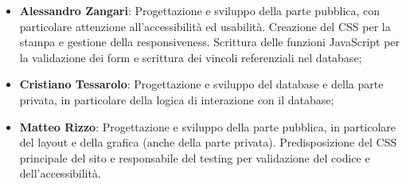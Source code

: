 \documentclass[12pt]{article}
\begin{document}
	\begin{itemize}
		\item \textbf{Alessandro Zangari}: Progettazione e sviluppo della parte pubblica, con particolare attenzione all'accessibilità ed usabilità. Creazione del CSS per la stampa e gestione della responsiveness. Scrittura delle funzioni JavaScript per la validazione dei form e scrittura dei vincoli referenziali nel database;
		\item \textbf{Cristiano Tessarolo}: Progettazione e sviluppo del database e della parte privata, in particolare della logica di interazione con il database;
		\item \textbf{Matteo Rizzo}: Progettazione e sviluppo della parte pubblica, in particolare del layout e della grafica (anche della parte privata). Predisposizione del CSS principale del sito e responsabile del testing per validazione del codice e dell'accessibilità.
	\end{itemize}
	
\end{document}
